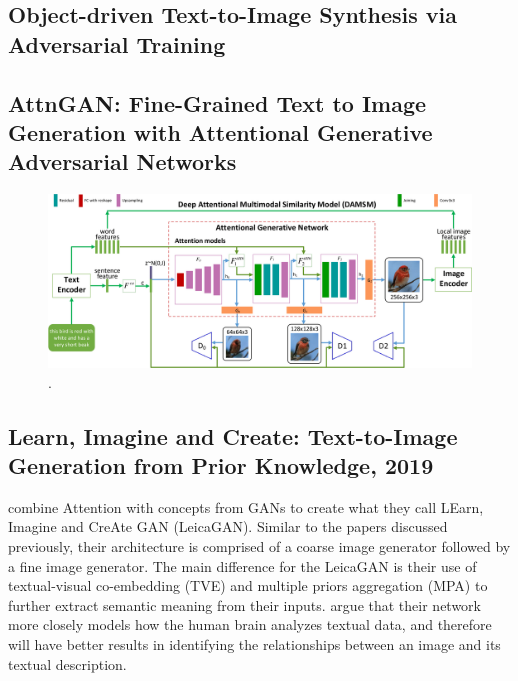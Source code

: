 \documentclass[letterpaper]{article} %
\begin{document}
\subsection{Object-driven Text-to-Image Synthesis via Adversarial Training}
\cite{objgan}

\subsection{AttnGAN: Fine-Grained Text to Image Generation
with Attentional Generative Adversarial Networks}
\cite{attngan}

\begin{figure}[htbp]
\centerline{\includegraphics[width=0.95\linewidth]{attngan.png}}
\caption{.}
\label{fig:attngan}
\end{figure}


\subsection{Learn, Imagine and Create: Text-to-Image Generation from Prior 
Knowledge, 2019}
\nocite{leica}
\cite{leica} combine Attention with concepts from GANs to create what they call
LEarn, Imagine and CreAte GAN (LeicaGAN). Similar to the papers discussed
previously, their architecture is comprised of a coarse image generator followed
by a fine image generator. The main difference for the LeicaGAN is their use
of textual-visual co-embedding (TVE) and multiple priors aggregation (MPA)
to further extract semantic meaning from their inputs. \cite{leica} argue that
their network more closely models how the human brain analyzes textual data,
and therefore will have better results in identifying the relationships between
an image and its textual description.
\end{document}

